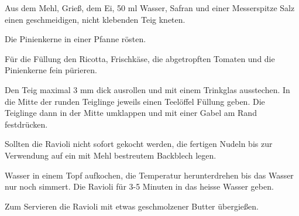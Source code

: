 \vspace*{\fill}
\begin{multicols}{2}

Aus dem Mehl, Grieß, dem Ei, 50 ml Wasser, Safran und einer Messerspitze Salz einen geschmeidigen, nicht klebenden Teig kneten.\newline

Die Pinienkerne in einer Pfanne rösten.\newline

Für die Füllung den Ricotta, Frischkäse, die abgetropften Tomaten und die Pinienkerne fein pürieren.\newline

Den Teig maximal 3 mm dick ausrollen und mit einem Trinkglas ausstechen.\newline
In die Mitte der runden Teiglinge jeweils einen Teelöffel Füllung geben. Die Teiglinge dann in der Mitte umklappen und mit einer Gabel am Rand festdrücken.\newline

Sollten die Ravioli nicht sofort gekocht werden, die fertigen Nudeln bis zur Verwendung auf ein mit Mehl bestreutem Backblech legen.\newline

Wasser in einem Topf aufkochen, die Temperatur herunterdrehen bis das Wasser nur noch simmert. Die Ravioli für 3-5 Minuten in das heisse Wasser geben.\newline

Zum Servieren die Ravioli mit etwas geschmolzener Butter übergießen. 

\end{multicols}
\vfill
